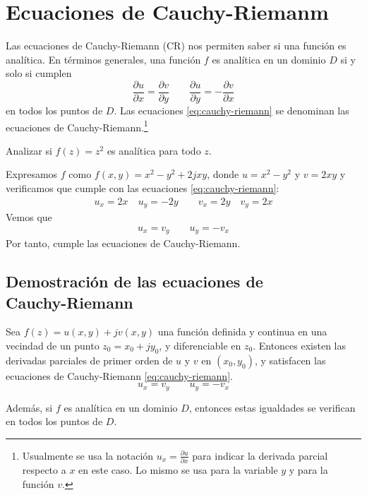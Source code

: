 \section{Ecuaciones de Cauchy-Riemanm}

Las ecuaciones de Cauchy-Riemann (CR) nos permiten saber si una función es analítica. En términos generales, una función $f$ es analítica en un dominio $D$ si y solo si cumplen
\begin{equation}
  \frac{\partial u}{\partial x} = \frac{\partial v}{\partial y} \qquad \frac{\partial u}{\partial y} = -\frac{\partial v}{\partial x}
  \label{eq:cauchy-riemann}
\end{equation}
en todos los puntos de $D$. Las ecuaciones \ref{eq:cauchy-riemann} se denominan las ecuaciones de Cauchy-Riemann.\footnote{Usualmente se usa la notación $u_x=\frac{\partial u}{\partial x}$ para indicar la derivada parcial respecto a $x$ en este caso. Lo mismo se usa para la variable $y$ y para la función $v$.}

\begin{example}
  Analizar si $f(z)=z^2$ es analítica para todo $z$. 

  Expresamos $f$ como $f(x,y)=x^2-y^2+2jxy$, donde $u=x^2-y^2$ y $v=2xy$ y verificamos que cumple con las ecuaciones \ref{eq:cauchy-riemann}:
  \begin{gather*}
    u_x = 2x \quad u_y = -2y \qquad v_x = 2y \quad v_y = 2x
  \end{gather*}
  Vemos que
  \begin{align*}
    u_x = v_y \qquad u_y = -v_x
  \end{align*}
  Por tanto, cumple las ecuaciones de Cauchy-Riemann.
\end{example}

\subsection[Demostración de las ecuaciones de Cauchy-Riemann]{Demostración de las ecuaciones de\\Cauchy-Riemann}

\begin{theorem}\label{teo:ecuaciones_de_cr}
Sea $f(z) = u(x, y) + jv(x, y)$ una función definida y continua en una vecindad de un punto $z_0 = x_0 + jy_0$, y diferenciable en $z_0$.  
Entonces existen las derivadas parciales de primer orden de $u$ y $v$ en $(x_0, y_0)$, y satisfacen las ecuaciones de Cauchy-Riemann \ref{eq:cauchy-riemann}.
\begin{equation*}
  u_x=v_y \qquad u_y=-v_x
\end{equation*}

Además, si $f$ es analítica en un dominio $D$, entonces estas igualdades se verifican en todos los puntos de $D$.
\end{theorem}

